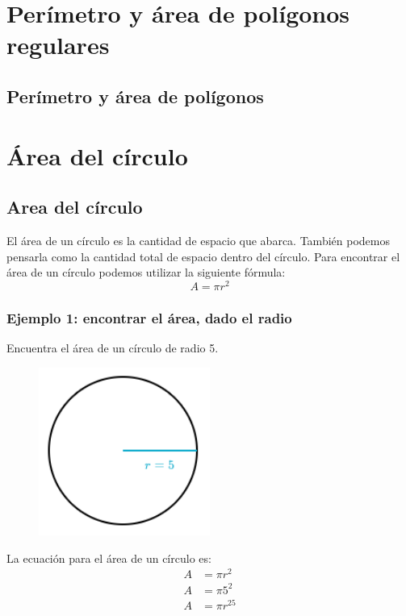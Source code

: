 \documentclass[11pt]{book}
\begin{document}
\newpage
\section{Per\'imetro y \'area de pol\'igonos regulares}
\subsection{Per\'imetro y \'area de pol\'igonos}

\section{\'Area del c\'irculo}


\subsection{Area del c\'irculo}
El área de un círculo es la cantidad de espacio que abarca. También podemos pensarla como la cantidad total de espacio dentro del círculo.
Para encontrar el área de un círculo podemos utilizar la siguiente fórmula:
\[A=\pi r^2\]

\subsubsection{Ejemplo 1: encontrar el área, dado el radio}
Encuentra el área de un círculo de radio 5.
\begin{figure}[H]
  \centering
  \includegraphics[width=0.5\textwidth]{./Unidad 2/Images/figS10_001.png}
\end{figure}
La ecuación para el área de un círculo es:
\begin{align*}
  A & = \pi r^2    \\
  A & = \pi 5^2    \\
  A & = \pi r^{25}
\end{align*}
\end{document}
